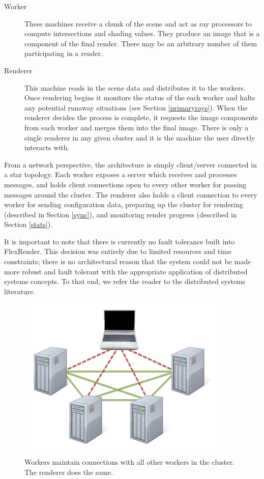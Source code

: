 \documentclass[12pt]{ucthesis}
\newcommand{\captionfonts}{\small\bf\ssp}
\begin{document}
\begin{description}
    \item[Worker] These machines receive a chunk of the scene and act as ray
        processors to compute intersections and shading values. They produce
        an image that is a component of the final render. There may be an
        arbitrary number of them participating in a render.
    \item[Renderer] This machine reads in the scene data and distributes it to
        the workers. Once rendering begins it monitors the status of the each
        worker and halts any potential runaway situations (see Section \ref{primaryrays}).
        When the renderer decides the process is complete, it requests
        the image components from each worker and merges them into the final
        image. There is only a single renderer in any given cluster and it is
        the machine the user directly interacts with.
\end{description}

From a network perspective, the architecture is simply client/server connected
in a star topology. Each worker exposes a server which receives and
processes messages, and holds client connections open to every other worker for
passing messages around the cluster. The renderer also holds a client connection
to every worker for sending configuration data, preparing up the cluster for rendering
(described in Section \ref{sync}), and monitoring render progress (described in
Section \ref{stats}).

It is important to note that there is currently no fault tolerance built into
FlexRender. This decision was entirely due to limited resources and time
constraints; there is no architectural reason that the system could not be made
more robust and fault tolerant with the appropriate application of distributed
systems concepts. To that end, we refer the reader to the distributed systems
literature.

\begin{figure}[h!]
    \centering
    \includegraphics[width=100mm]{figures/netarch.pdf}
    \captionfonts
    \caption{Workers maintain connections with all other workers in the cluster. The renderer does the same.}
    \label{fig:netarch}
\end{figure}
\end{document}
